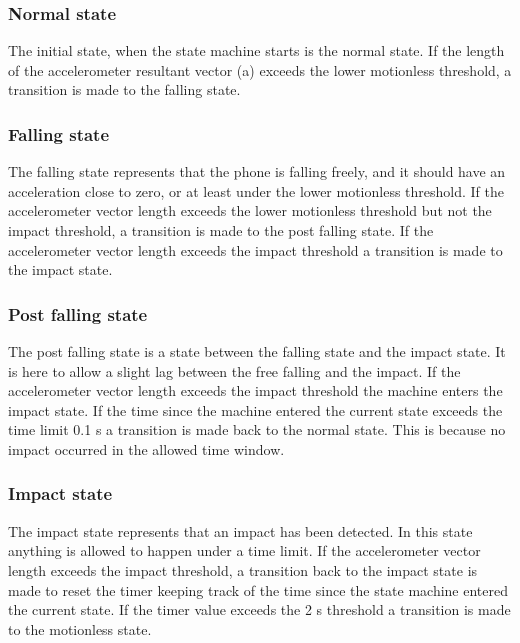 \documentclass[12pt, a4paper, onecolumn]{article}
\begin{document}
	\subsubsection{Normal state}
	
	The initial state, when the state machine starts is the normal state. If the length of the accelerometer resultant vector (a) exceeds the lower motionless threshold, a transition is made to the falling state.
	
	\subsubsection{Falling state}
	
	The falling state represents that the phone is falling freely, and it should have an acceleration close to zero, or at least under the lower motionless threshold. If the accelerometer vector length exceeds the lower motionless threshold but not the impact threshold, a transition is made to the post falling state. If the accelerometer vector length exceeds the impact threshold a transition is made to the impact state.
	
	\subsubsection{Post falling state}
	
	The post falling state is a state between the falling state and the impact state. It is here to allow a slight lag between the free falling and the impact. If the accelerometer vector length exceeds the impact threshold the machine enters the impact state. If the time since the machine entered the current state exceeds the time limit 0.1 s a transition is made back to the normal state. This is because no impact occurred in the allowed time window.
	
	\subsubsection{Impact state}
	
	The impact state represents that an impact has been detected. In this state anything is allowed to happen under a time limit. If the accelerometer vector length exceeds the impact threshold, a transition back to the impact state is made to reset the timer keeping track of the time since the state machine entered the current state. If the timer value exceeds the 2 s threshold a transition is made to the motionless state.
	
\end{document}
